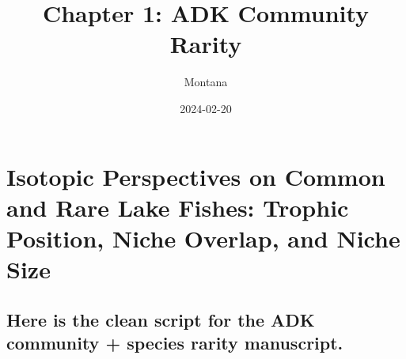 \documentclass[
]{article}
\title{Chapter 1: ADK Community Rarity}
\author{Montana}
\date{2024-02-20}
\begin{document}
\maketitle

\hypertarget{isotopic-perspectives-on-common-and-rare-lake-fishes-trophic-position-niche-overlap-and-niche-size}{%
\section{Isotopic Perspectives on Common and Rare Lake Fishes: Trophic
Position, Niche Overlap, and Niche
Size}\label{isotopic-perspectives-on-common-and-rare-lake-fishes-trophic-position-niche-overlap-and-niche-size}}

\hypertarget{here-is-the-clean-script-for-the-adk-community-species-rarity-manuscript.}{%
\subsection{Here is the clean script for the ADK community + species
rarity
manuscript.}\label{here-is-the-clean-script-for-the-adk-community-species-rarity-manuscript.}}
\end{document}
